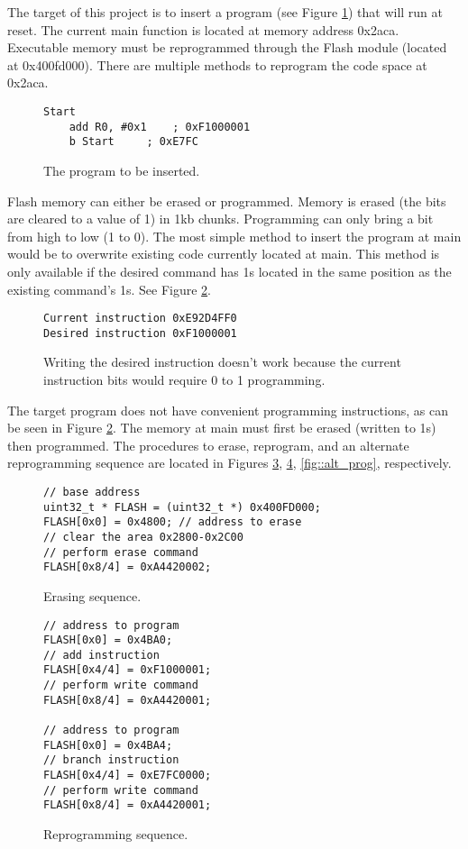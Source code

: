 The target of this project is to insert a program (see Figure \ref{fig::insert}) that will run at reset. The current main function is located at memory address 0x2aca. Executable memory must be reprogrammed through the Flash module (located at 0x400fd000). There are multiple methods to reprogram the code space at 0x2aca. 
	\begin{figure}[htbp]
		\begin{lstlisting}
Start
	add R0, #0x1 	; 0xF1000001
	b Start		; 0xE7FC
		\end{lstlisting}
		\caption{The program to be inserted. }\label{fig::insert}
	\end{figure}

Flash memory can either be erased or programmed. Memory is erased (the bits are cleared to a value of 1) in 1kb chunks. Programming can only bring a bit from high to low (1 to 0). The most simple method to insert the program at main would be to overwrite existing code currently located at main. This method is only available if the desired command has 1s located in the same position as the existing command's 1s. See Figure \ref{fig::ham}. 
	\begin{figure}[htbp]
		\begin{lstlisting}
Current instruction	0xE92D4FF0
Desired instruction	0xF1000001
		\end{lstlisting}
		\caption{Writing the desired instruction doesn't work because the current instruction bits would require 0 to 1 programming.  }\label{fig::ham}
	\end{figure}
The target program does not have convenient programming instructions, as can be seen in Figure \ref{fig::ham}. The memory at main must first be erased (written to 1s) then programmed. The procedures to erase, reprogram, and an alternate reprogramming sequence are located in Figures \ref{fig::erase}, \ref{fig::prog}, \ref{fig::alt_prog}, respectively. 
		\lstset{language=C} 
	\begin{figure}[htbp]
		\begin{lstlisting}
// base address
uint32_t * FLASH = (uint32_t *) 0x400FD000;
FLASH[0x0] = 0x4800; // address to erase
// clear the area 0x2800-0x2C00
// perform erase command
FLASH[0x8/4] = 0xA4420002; 
		\end{lstlisting}
		\caption{Erasing sequence. }\label{fig::erase}
	\end{figure}
	\begin{figure}[htbp]
		\begin{lstlisting}
// address to program
FLASH[0x0] = 0x4BA0; 
// add instruction
FLASH[0x4/4] = 0xF1000001; 
// perform write command
FLASH[0x8/4] = 0xA4420001; 

// address to program
FLASH[0x0] = 0x4BA4; 
// branch instruction
FLASH[0x4/4] = 0xE7FC0000; 
// perform write command
FLASH[0x8/4] = 0xA4420001; 
		\end{lstlisting}
		\caption{Reprogramming sequence. }\label{fig::prog}
	\end{figure}
